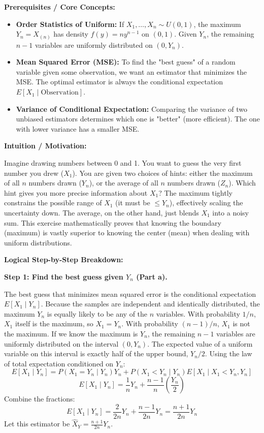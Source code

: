 \begin{solution}
\textbf{Prerequisites / Core Concepts:}
\begin{itemize}
    \item \textbf{Order Statistics of Uniform:} If $X_1, \dots, X_n \sim U(0,1)$, the maximum $Y_n = X_{(n)}$ has density $f(y) = n y^{n-1}$ on $(0,1)$. Given $Y_n$, the remaining $n-1$ variables are uniformly distributed on $(0, Y_n)$.
    \item \textbf{Mean Squared Error (MSE):} To find the "best guess" of a random variable given some observation, we want an estimator that minimizes the MSE. The optimal estimator is always the conditional expectation $E[X_1 \mid \text{Observation}]$.
    \item \textbf{Variance of Conditional Expectation:} Comparing the variance of two unbiased estimators determines which one is "better" (more efficient). The one with lower variance has a smaller MSE.
\end{itemize}

\textbf{Intuition / Motivation:}

Imagine drawing numbers between 0 and 1. You want to guess the very first number you drew ($X_1$). You are given two choices of hints: either the maximum of all $n$ numbers drawn ($Y_n$), or the average of all $n$ numbers drawn ($Z_n$). Which hint gives you more precise information about $X_1$? The maximum tightly constrains the possible range of $X_1$ (it must be $\leq Y_n$), effectively scaling the uncertainty down. The average, on the other hand, just blends $X_1$ into a noisy sum. This exercise mathematically proves that knowing the boundary (maximum) is vastly superior to knowing the center (mean) when dealing with uniform distributions.

\textbf{Logical Step-by-Step Breakdown:}

\textbf{Step 1: Find the best guess given $Y_n$ (Part a).}

The best guess that minimizes mean squared error is the conditional expectation $E[X_1 \mid Y_n]$.
Because the samples are independent and identically distributed, the maximum $Y_n$ is equally likely to be any of the $n$ variables.
With probability $1/n$, $X_1$ itself is the maximum, so $X_1 = Y_n$.
With probability $(n-1)/n$, $X_1$ is not the maximum. If we know the maximum is $Y_n$, the remaining $n-1$ variables are uniformly distributed on the interval $(0, Y_n)$. The expected value of a uniform variable on this interval is exactly half of the upper bound, $Y_n/2$.
Using the law of total expectation conditioned on $Y_n$:
\[ E[X_1 \mid Y_n] = P(X_1 = Y_n \mid Y_n) Y_n + P(X_1 < Y_n \mid Y_n) E[X_1 \mid X_1 < Y_n, Y_n] \]
\[ E[X_1 \mid Y_n] = \frac{1}{n} Y_n + \frac{n-1}{n} \left( \frac{Y_n}{2} \right) \]
Combine the fractions:
\[ E[X_1 \mid Y_n] = \frac{2}{2n} Y_n + \frac{n-1}{2n} Y_n = \frac{n+1}{2n} Y_n \]
Let this estimator be $\hat{X}_Y = \frac{n+1}{2n} Y_n$.


\end{solution}
